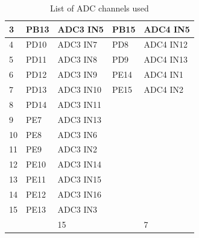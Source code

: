 \begin{table}[]
\begin{tabular}{@{}lllll@{}}
\multicolumn{1}{|l|}{\cellcolor[HTML]{EFEFEF}3} & \multicolumn{1}{l|}{PB13} & \multicolumn{1}{l|}{ADC3 IN5} & \multicolumn{1}{l|}{PB15} & \multicolumn{1}{l|}{ADC4 IN5} \\ \midrule
\multicolumn{1}{|l|}{\cellcolor[HTML]{EFEFEF}4} & \multicolumn{1}{l|}{PD10} & \multicolumn{1}{l|}{ADC3 IN7} & \multicolumn{1}{l|}{PD8} & \multicolumn{1}{l|}{ADC4 IN12} \\ \midrule
\multicolumn{1}{|l|}{\cellcolor[HTML]{EFEFEF}5} & \multicolumn{1}{l|}{PD11} & \multicolumn{1}{l|}{ADC3 IN8} & \multicolumn{1}{l|}{PD9} & \multicolumn{1}{l|}{ADC4 IN13} \\ \midrule
\multicolumn{1}{|l|}{\cellcolor[HTML]{EFEFEF}6} & \multicolumn{1}{l|}{PD12} & \multicolumn{1}{l|}{ADC3 IN9} & \multicolumn{1}{l|}{PE14} & \multicolumn{1}{l|}{ADC4 IN1} \\ \midrule
\multicolumn{1}{|l|}{\cellcolor[HTML]{EFEFEF}7} & \multicolumn{1}{l|}{PD13} & \multicolumn{1}{l|}{ADC3 IN10} & \multicolumn{1}{l|}{PE15} & \multicolumn{1}{l|}{ADC4 IN2} \\ \midrule
\multicolumn{1}{|l|}{\cellcolor[HTML]{EFEFEF}8} & \multicolumn{1}{l|}{PD14} & \multicolumn{1}{l|}{ADC3 IN11} & \multicolumn{1}{l|}{} & \multicolumn{1}{l|}{} \\ \midrule
\multicolumn{1}{|l|}{\cellcolor[HTML]{EFEFEF}9} & \multicolumn{1}{l|}{PE7} & \multicolumn{1}{l|}{ADC3 IN13} & \multicolumn{1}{l|}{} & \multicolumn{1}{l|}{} \\ \midrule
\multicolumn{1}{|l|}{\cellcolor[HTML]{EFEFEF}10} & \multicolumn{1}{l|}{PE8} & \multicolumn{1}{l|}{ADC3 IN6} & \multicolumn{1}{l|}{} & \multicolumn{1}{l|}{} \\ \midrule
\multicolumn{1}{|l|}{\cellcolor[HTML]{EFEFEF}11} & \multicolumn{1}{l|}{PE9} & \multicolumn{1}{l|}{ADC3 IN2} & \multicolumn{1}{l|}{} & \multicolumn{1}{l|}{} \\ \midrule
\multicolumn{1}{|l|}{\cellcolor[HTML]{EFEFEF}12} & \multicolumn{1}{l|}{PE10} & \multicolumn{1}{l|}{ADC3 IN14} & \multicolumn{1}{l|}{} & \multicolumn{1}{l|}{} \\ \midrule
\multicolumn{1}{|l|}{\cellcolor[HTML]{EFEFEF}13} & \multicolumn{1}{l|}{PE11} & \multicolumn{1}{l|}{ADC3 IN15} & \multicolumn{1}{l|}{} & \multicolumn{1}{l|}{} \\ \midrule
\multicolumn{1}{|l|}{\cellcolor[HTML]{EFEFEF}14} & \multicolumn{1}{l|}{PE12} & \multicolumn{1}{l|}{ADC3 IN16} & \multicolumn{1}{l|}{} & \multicolumn{1}{l|}{} \\ \midrule
\multicolumn{1}{|l|}{\cellcolor[HTML]{EFEFEF}15} & \multicolumn{1}{l|}{PE13} & \multicolumn{1}{l|}{ADC3 IN3} & \multicolumn{1}{l|}{} & \multicolumn{1}{l|}{} \\ \midrule
\rowcolor[HTML]{EFEFEF} 
\multicolumn{1}{|l|}{\cellcolor[HTML]{EFEFEF}Summe} & \multicolumn{1}{l|}{\cellcolor[HTML]{EFEFEF}} & \multicolumn{1}{l|}{\cellcolor[HTML]{EFEFEF}15} & \multicolumn{1}{l|}{\cellcolor[HTML]{EFEFEF}} & \multicolumn{1}{l|}{\cellcolor[HTML]{EFEFEF}7} \\ \bottomrule
 
\end{tabular}
	\caption{List of ADC channels used}
	\label{tab:4.1}
\end{table}

